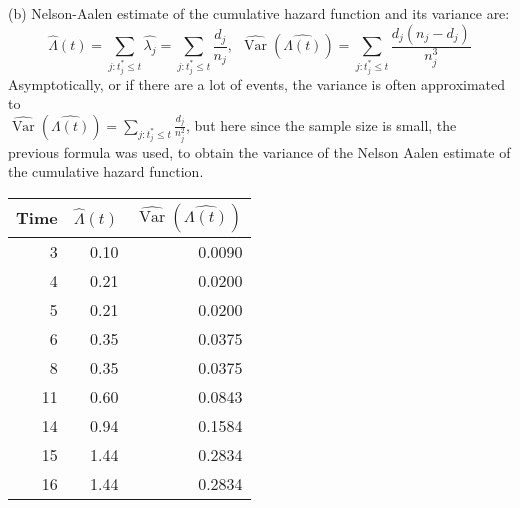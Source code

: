 \documentclass[11pt]{extarticle} %
\newcommand{\Var}{\operatorname{Var}}
\begin{document}
\noindent
(b) Nelson-Aalen estimate of the cumulative hazard function and its variance are:
\[ \hat{\Lambda}(t) = \sum_{j: t_j^* \leq t} \hat{\lambda_j} = \sum_{j: t_j^* \leq t} \frac{d_j}{n_j}, \ \ \hat{\Var}(\hat{\Lambda(t)}) = \sum_{j: t_j^* \leq t} \frac{d_j(n_j - d_j)}{n_j^3} \]
Asymptotically, or if there are a lot of events, the variance is often approximated to \\ $\hat{\Var}(\hat{\Lambda(t)}) = \sum_{j: t_j^* \leq t} \frac{d_j}{n_j^2}$, but here since the sample size is small, the previous formula was used, to obtain the variance of the Nelson Aalen estimate of the cumulative hazard function. 
\begin{table}[ht]
\centering
\begin{tabular}{rrr}
  \hline
 Time & $\hat{\Lambda}(t)$ & $\hat{\Var}(\hat{\Lambda(t)})$ \\ 
  \hline
	3 & 0.10 & 0.0090 \\ 
	4 & 0.21 & 0.0200 \\ 
	5 & 0.21 & 0.0200 \\ 
	6 & 0.35 & 0.0375 \\ 
	8 & 0.35 & 0.0375 \\ 
	11 & 0.60 & 0.0843 \\ 
	14 & 0.94 & 0.1584 \\ 
	15 & 1.44 & 0.2834 \\ 
	16 & 1.44 & 0.2834 \\ 
   \hline
\end{tabular}
\end{table}
\end{document}
